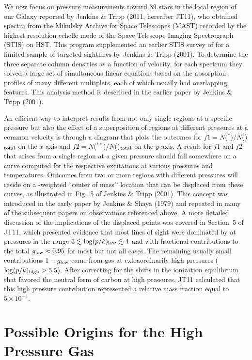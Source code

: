\documentclass[modern]{aastex63}
\begin{document}
We now focus on  pressure measurements toward 89 stars in the local region of our 
Galaxy reported by Jenkins \& Tripp (2011, hereafter JT11), who obtained spectra from the 
Mikulsky Archive for Space Telescopes (MAST) recorded by the highest resolution echelle mode 
of the Space Telescope Imaging Spectrograph (STIS) on HST.  This program supplemented an 
earlier STIS survey of  for a limited sample of targeted sightlines by Jenkins \& Tripp 
(2001).  To determine the three separate column densities as a function of velocity, for each 
spectrum they solved a large set of simultaneous linear equations based on the absorption 
profiles of many different multiplets, each of which usually had overlapping features.  This 
analysis method is described in the earlier paper by Jenkins \& Tripp (2001). 

An efficient way to interpret results from not only single regions at a specific pressure but also 
the effect of a superposition of regions at different pressures at a common velocity is through a 
diagram that plots the outcomes for $f1=N$($^*$)/$N$()$_{\rm total}$ on 
the $x$-axis and $f2=N$($^{**}$)/$N$()$_{\rm total}$ on the $y$-axis.  A 
result for $f1$ and $f2$ that arises from a single region at a given pressure should fall 
somewhere on a curve computed for the respective excitations at various pressures and 
temperatures.  Outcomes from two or more regions with different pressures will reside on a 
-weighted ``center of mass’’ location that can be displaced from these curves, as 
illustrated in Fig.~5 of Jenkins \& Tripp (2001).  This concept was introduced in the early paper 
by Jenkins \& Shaya (1979) and repeated in many of the subsequent papers on  
observations referenced above.  A more detailed discussion of the implications of the displaced 
points was covered in Section~5 of JT11, which presented evidence that most lines of sight 
were dominated by  at pressures in the range $3\lesssim \log(p/k)_{\rm low} \lesssim 
4$ and with fractional contributions to the total $g_{\rm low}\approx 0.95$ for most but not all 
cases.  The remaining usually small contributions $1-g_{\rm low}$ came from gas at 
extraordinarily high pressures ($\log (p/k)_{\rm high}> 5.5$).  After correcting for the shifts in 
the ionization equilibrium that favored the neutral form of carbon at high pressures, JT11 
calculated that this high pressure contribution represented a relative mass fraction equal to 
$5\times 10^{-4}$.  
\newpage
\section{Possible Origins for the High Pressure Gas}\label{sec:origin}
\end{document}
